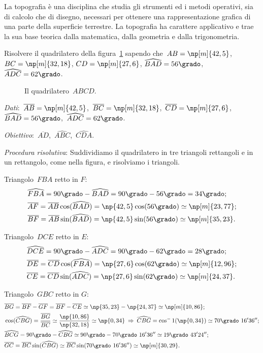 La topografia è una disciplina che studia gli strumenti ed i metodi operativi, sia di calcolo che di disegno, necessari per ottenere
una rappresentazione grafica di una parte della superficie terrestre.
La topografia ha carattere applicativo e trae la sua base teorica dalla matematica, dalla geometria e dalla trigonometria.

\begin{exrig}
 \begin{esempio}
Risolvere il quadrilatero della figura~\ref{fig:C.7} sapendo che~$AB=\np[m]{42,5}$, $BC=\np[m]{32,18}$, $CD=\np[m]{27,6}$,
$\widehat{BAD}=56\grado$, $\widehat{ADC}=62\grado$.

\begin{figure}[ht]
\centering

\caption{Il quadrilatero~$ABCD$.}\label{fig:C.7}
\end{figure}

\emph{Dati}:~$\overline{AB}=\np[m]{42,5}$,\quad~$\overline{BC}=\np[m]{32,18}$,\quad~$\overline{CD}=\np[m]{27,6}$,\quad~$\widehat{BAD}=56\grado$,\quad~$\widehat{ADC}=62\grado$.

\emph{Obiettivo}:~$\overline{AD}$,\quad~$\widehat{ABC}$,\quad~$\widehat{CDA}$.

\emph{Procedura risolutiva}:
Suddividiamo il quadrilatero in tre triangoli rettangoli e in un rettangolo, come nella figura, e risolviamo i triangoli.

Triangolo~$FBA$ retto in $F$:
\begin{align*}
&\widehat{FBA}=90\grado-\widehat{BAD}=90\grado-56\grado=34\grado;\\
&\overline{AF}=\overline{AB}\cos(\widehat{BAD})=\np{42,5}\cos(56\grado)\simeq \np[m]{23,77};\\
&\overline{BF}=\overline{AB}\sin(\widehat{BAD})=\np{42,5}\sin(56\grado)\simeq \np[m]{35,23}.
\end{align*}

Triangolo~$DCE$ retto in $E$:
\begin{align*}
&\widehat{DCE}=90\grado-\widehat{ADC}=90\grado-62\grado=28\grado;\\
&\overline{DE}=\overline{CD}\cos(\widehat{FBA})=\np{27,6}\cos(62\grado)\simeq \np[m]{12,96};\\
&\overline{CE}=\overline{CD}\sin(\widehat{ADC})=\np{27,6}\sin(62\grado)\simeq \np[m]{24,37}.
\end{align*}

Triangolo~$GBC$ retto in $G$:
\begin{align*}
&\overline{BG}=\overline{BF}-\overline{GF}=\overline{BF}-\overline{CE}\simeq \np{35,23}-\np{24,37}\simeq \np[m]{10,86};\\
&\cos(\widehat{CBG})=\frac{\overline{BG}}{\overline{BC}}\simeq \frac{\np{10,86}}{\np{32,18}}\simeq \np{0,34}\:\Rightarrow\: \widehat{CBG}=\cos^-1(\np{0,34})\simeq 70\grado~16' 36'';\\
&\widehat{BCG}=90\grado-\widehat{CBG}\simeq 90\grado-70\grado~16' 36''\simeq 19\grado~43' 24'';\\
&\overline{GC}=\overline{BC}\sin(\widehat{CBG})\simeq \overline{BC}\sin(70\grado~16' 36'')\simeq \np[m]{30,29}.
\end{align*}


\end{esempio}
\end{exrig}
